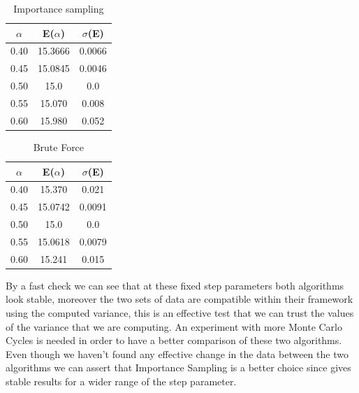 \documentclass[10pt,a4paper,titlepage]{article}
\begin{document}
\begin{minipage}[b]{0.5\textwidth}\centering
\begin{table}[H]
\caption{{\footnotesize Importance sampling }}
\begin{center}

\begin{tabular}[t]{c c c}
\hline
$\alpha$ & E($\alpha$) & $\sigma $(E) \\\hline 
0.40&15.3666& 0.0066\\ 
0.45& 15.0845& 0.0046 \\
0.50& 15.0& 0.0\\ 
0.55& 15.070& 0.008\\ 
0.60& 15.980& 0.052 \\
\hline
\end{tabular}
\end{center}
\end{table}
\end{minipage}
\begin{minipage}[b]{0.5\linewidth}\centering
\begin{table}[H]
\caption{{\footnotesize Brute Force }}
\begin{center}
\begin{tabular}[t]{c c c}
\hline
$\alpha$ & E($\alpha$) & $\sigma $(E) \\\hline
0.40& 15.370 &0.021\\ 
0.45& 15.0742 &0.0091\\
0.50& 15.0 &0.0 \\
0.55& 15.0618& 0.0079\\ 
0.60& 15.241& 0.015 \\
\hline
\end{tabular}
\end{center}
\end{table}
\end{minipage}
By a fast check we can see that at these fixed step parameters both algorithms look stable, moreover the two sets of data are compatible within their framework using the computed variance, this is an effective test that we can trust the values of the variance that we are computing. An experiment with more Monte Carlo Cycles is needed in order to have a better comparison of these two algorithms.\\
Even though we haven't found any effective change in the data between the two algorithms we can assert that Importance Sampling is a better choice since gives stable results for a wider range of the step parameter.  
\end{document}
